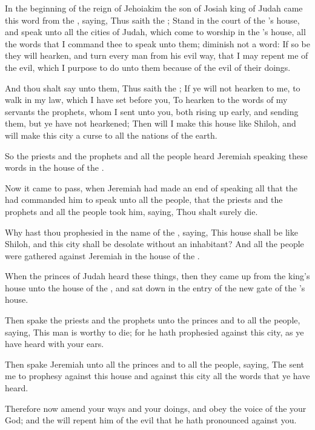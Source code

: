 \Chapter
\Verse In the beginning of the reign of Jehoiakim the son of Josiah king of Judah came this word from the \LORD, saying, \Verse Thus saith the \LORD; Stand in the court of the \LORD's house, and speak unto all the cities of Judah, which come to worship in the \LORD's house, all the words that I command thee to speak unto them; diminish not a word: \Verse If so be they will hearken, and turn every man from his evil way, that I may repent me of the evil, which I purpose to do unto them because of the evil of their doings.

\Verse And thou shalt say unto them, Thus saith the \LORD; If ye will not hearken to me, to walk in my law, which I have set before you, \Verse To hearken to the words of my servants the prophets, whom I sent unto you, both rising up early, and sending them, but ye have not hearkened; \Verse Then will I make this house like Shiloh, and will make this city a curse to all the nations of the earth.

\Verse So the priests and the prophets and all the people heard Jeremiah speaking these words in the house of the \LORD.

\Verse Now it came to pass, when Jeremiah had made an end of speaking all that the \LORD had commanded him to speak unto all the people, that the priests and the prophets and all the people took him, saying, Thou shalt surely die.

\Verse Why hast thou prophesied in the name of the \LORD, saying, This house shall be like Shiloh, and this city shall be desolate without an inhabitant?  And all the people were gathered against Jeremiah in the house of the \LORD.

\Verse When the princes of Judah heard these things, then they came up from the king's house unto the house of the \LORD, and sat down in the entry of the new gate of the \LORD's house.

\Verse Then spake the priests and the prophets unto the princes and to all the people, saying, This man is worthy to die; for he hath prophesied against this city, as ye have heard with your ears.

\Verse Then spake Jeremiah unto all the princes and to all the people, saying, The \LORD sent me to prophesy against this house and against this city all the words that ye have heard.

\Verse Therefore now amend your ways and your doings, and obey the voice of the \LORD your God; and the \LORD will repent him of the evil that he hath pronounced against you.

